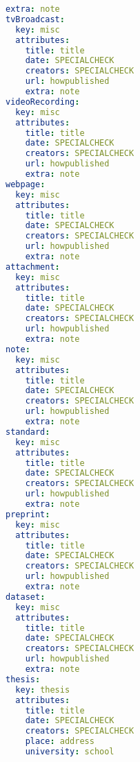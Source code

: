 \begin{lstlisting}[language=yaml, caption=Python LaTex - zotero\_biblatex\_keystore.yaml - x-y-Achse Konfigurationsdatei - Zotero BibLaTex Importer,captionpos=b,label={lst:zotero_biblatex_keystore},breaklines=true]
    extra: note
tvBroadcast:
  key: misc
  attributes:
    title: title
    date: SPECIALCHECK
    creators: SPECIALCHECK
    url: howpublished
    extra: note
videoRecording:
  key: misc
  attributes:
    title: title
    date: SPECIALCHECK
    creators: SPECIALCHECK
    url: howpublished
    extra: note
webpage:
  key: misc
  attributes:
    title: title
    date: SPECIALCHECK
    creators: SPECIALCHECK
    url: howpublished
    extra: note
attachment:
  key: misc
  attributes:
    title: title
    date: SPECIALCHECK
    creators: SPECIALCHECK
    url: howpublished
    extra: note
note:
  key: misc
  attributes:
    title: title
    date: SPECIALCHECK
    creators: SPECIALCHECK
    url: howpublished
    extra: note
standard:
  key: misc
  attributes:
    title: title
    date: SPECIALCHECK
    creators: SPECIALCHECK
    url: howpublished
    extra: note
preprint:
  key: misc
  attributes:
    title: title
    date: SPECIALCHECK
    creators: SPECIALCHECK
    url: howpublished
    extra: note
dataset:
  key: misc
  attributes:
    title: title
    date: SPECIALCHECK
    creators: SPECIALCHECK
    url: howpublished
    extra: note
thesis:
  key: thesis
  attributes:
    title: title
    date: SPECIALCHECK
    creators: SPECIALCHECK
    place: address
    university: school
\end{lstlisting}